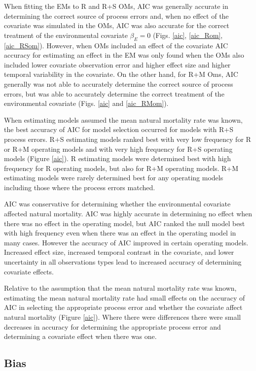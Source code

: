 \documentclass[
  12pt,
]{article}
\begin{document}
When fitting the EMs to R and R+S OMs, AIC was generally accurate in determining the correct source of process errors and, when no effect of the covariate was simulated in the OMs, AIC was also accurate for the correct treatment of the environmental covariate \(\beta_E = 0\) (Figs. \ref{aic}, \ref{aic_Rom}, \ref{aic_RSom}). However, when OMs included an effect of the covariate AIC accuracy for estimating an effect in the EM was only found when the OMs also included lower covariate observation error and higher effect size and higher temporal variability in the covariate. On the other hand, for R+M Oms, AIC generally was not able to accurately determine the correct source of process errors, but was able to accurately determine the correct treatment of the environmental covariate (Figs. \ref{aic} and \ref{aic_RMom}).

When estimating models assumed the mean natural mortality rate was known, the best accuracy of AIC for model selection occurred for models with R+S process errors. R+S estimating models ranked best with very low frequency for R or R+M operating models and with very high frequency for R+S operating models (Figure \ref{aic}). R estimating models were determined best with high frequency for R operating models, but also for R+M operating models. R+M estimating models were rarely determined best for any operating models including those where the process errors matched.

AIC was conservative for determining whether the environmental covariate affected natural mortality. AIC was highly accurate in determining no effect when there was no effect in the operating model, but AIC ranked the null model best with high frequency even when there was an effect in the operating model in many cases. However the accuracy of AIC improved in certain operating models. Increased effect size, increased temporal contrast in the covariate, and lower uncertainty in all observations types lead to increased accuracy of determining covariate effects.

Relative to the assumption that the mean natural mortality rate was known, estimating the mean natural mortality rate had small effects on the accuracy of AIC in selecting the appropriate process error and whether the covariate affect natural mortality (Figure \ref{aic}). Where there were differences there were small decreases in accuracy for determining the appropriate process error and determining a covariate effect when there was one.

\hypertarget{bias-1}{%
\subsection*{Bias}\label{bias-1}}
\end{document}
